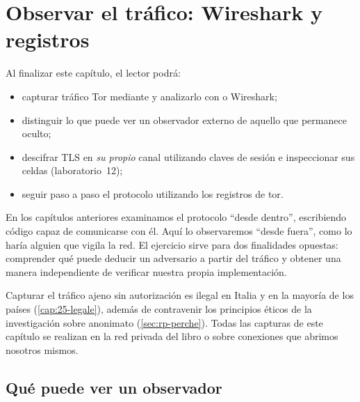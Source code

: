 \chapter{Observar el tráfico: Wireshark y registros}\label{cap:20-traffico}

\begin{obiettivi}
Al finalizar este capítulo, el lector podrá:
\begin{itemize}[nosep]
  \item capturar tráfico Tor mediante  y analizarlo con  o Wireshark;
  \item distinguir lo que puede ver un observador externo de aquello que permanece oculto;
  \item descifrar TLS en \emph{su propio} canal utilizando claves de sesión e inspeccionar sus celdas (laboratorio~12);
  \item seguir paso a paso el protocolo utilizando los registros de tor.
\end{itemize}
\end{obiettivi}

En los capítulos anteriores examinamos el protocolo \enquote{desde dentro}, escribiendo código capaz de comunicarse con él. Aquí lo observaremos \enquote{desde fuera}, como lo haría alguien que vigila la red. El ejercicio sirve para dos finalidades opuestas: comprender qué puede deducir un adversario a partir del tráfico y obtener una manera independiente de verificar nuestra propia implementación.

\begin{attenzione}
Capturar el tráfico ajeno sin autorización es ilegal en Italia y en la mayoría de los países (\cref{cap:25-legale}), además de contravenir los principios éticos de la investigación sobre anonimato (\cref{sec:rp-perche}). Todas las capturas de este capítulo se realizan en la red privada del libro o sobre conexiones que abrimos nosotros mismos.
\end{attenzione}

\section{Qué puede ver un observador}\label{sec:traffico-osservatore}

